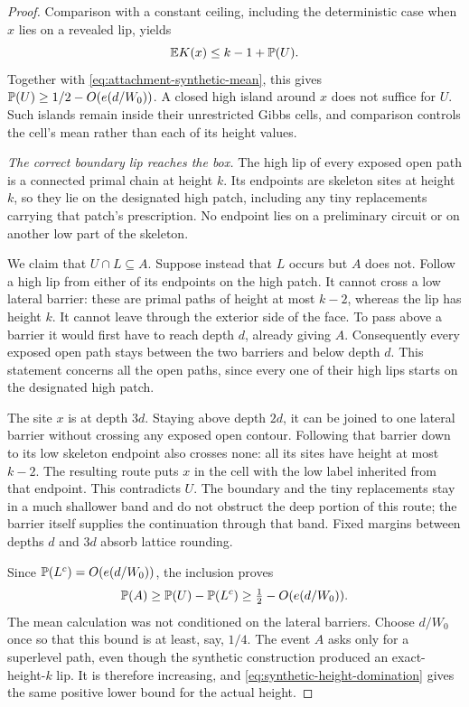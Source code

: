 \begin{proof}
Comparison with a constant ceiling, including the deterministic case when
$x$ lies on a revealed lip, yields
\begin{equation}\label{eq:attachment-cell-mean}
 \mathbb E K(x)\le k-1+\mathbb P(U).
\end{equation}
Together with \eqref{eq:attachment-synthetic-mean}, this gives
$\mathbb P(U)\ge1/2-O(e(d/W_0))$.  A closed high island around $x$ does not
suffice for $U$.  Such islands remain inside their unrestricted Gibbs
cells, and comparison controls the cell's mean rather than each of its
height values.

\emph{The correct boundary lip reaches the box.}
The high lip of every exposed open path is a connected primal chain at
height $k$.  Its endpoints are skeleton sites at height $k$, so they lie
on the designated high patch, including any tiny replacements carrying
that patch's prescription.  No endpoint lies on a preliminary circuit or
on another low part of the skeleton.

We claim that $U\cap L\subseteq A$.  Suppose instead that $L$ occurs but
$A$ does not.  Follow a high lip from either of its endpoints on the high
patch.  It cannot cross a low lateral barrier: these are primal paths of
height at most $k-2$, whereas the lip has height $k$.  It cannot leave
through the exterior side of the face.  To pass above a barrier it would
first have to reach depth $d$, already giving $A$.  Consequently every
exposed open path stays between the two barriers and below depth $d$.
This statement concerns all the open paths, since every one of their high
lips starts on the designated high patch.

The site $x$ is at depth $3d$.  Staying above depth $2d$, it can be
joined to one lateral barrier without crossing any exposed open contour.
Following that barrier down to its low skeleton endpoint also crosses
none: all its sites have height at most $k-2$.  The resulting route puts
$x$ in the cell with the low label inherited from that endpoint.  This
contradicts $U$.  The boundary and the tiny replacements stay in a much
shallower band and do not obstruct the deep portion of this route; the
barrier itself supplies the continuation through that band.  Fixed margins
between depths $d$ and $3d$ absorb lattice rounding.

Since $\mathbb P(L^c)=O(e(d/W_0))$, the inclusion proves
\[
 \mathbb P(A)\ge\mathbb P(U)-\mathbb P(L^c)\ge\tfrac12-O(e(d/W_0)).
\]
The mean calculation was not conditioned on the lateral barriers.
Choose $d/W_0$ once so that this bound is at least, say, $1/4$.
The event $A$ asks only for a superlevel path, even though the synthetic
construction produced an exact-height-$k$ lip.  It is therefore increasing,
and \eqref{eq:synthetic-height-domination} gives the same positive lower
bound for the actual height.


\end{proof}
